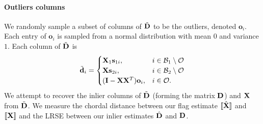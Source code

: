 \paragraph{Outliers columns}
We randomly sample a subset of columns of $\tilde{\mathbf{D}}$ to be the outliers, denoted $\mathbf{o}_i$. Each entry of $\mathbf{o}_i$ is sampled from a normal distribution with mean $0$ and variance $1$. Each column of $\tilde{\mathbf{D}}$ is
\begin{equation}
    \tilde{\mathbf{d}}_i = \begin{cases}
        \mathbf{X}_1\mathbf{s}_{1i}, & i \in \mathcal{B}_1\setminus \mathcal{O}\\
        \mathbf{X}\mathbf{s}_{2i}, & i \in \mathcal{B}_2\setminus \mathcal{O}\\
        (\mathbf{I} - \mathbf{X}\mathbf{X}^T)\mathbf{o}_i, & i \in \mathcal{O}.\\
    \end{cases}
\end{equation}
We attempt to recover the inlier columns of $\tilde{\mathbf{D}}$ (forming the matrix $\mathbf{D}$) and $\mathbf{X}$ from $\tilde{\mathbf{D}}$. We measure the chordal distance between our flag estimate $[\![\hat{\mathbf{X}}]\!]$ and $[\![\mathbf{X}]\!]$ and the LRSE between our inlier estimates $\hat{\mathbf{D}}$ and $\mathbf{D}$.



